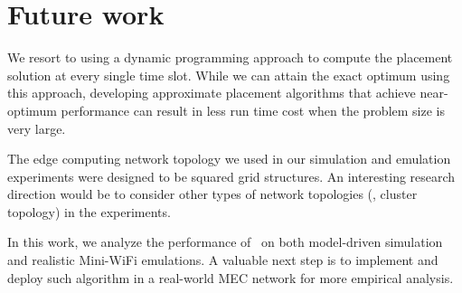 

\section{Future work}
\label{section:future work}

We resort to using a dynamic programming approach to compute the placement solution at every single time slot. While we can attain the exact optimum using this approach, developing approximate placement algorithms that achieve near-optimum performance can result in less run time cost when the problem size is very large.



The edge computing network topology we used in our simulation and emulation experiments were designed to be squared grid structures. An interesting research direction would be to consider other types of network topologies (\eg, cluster topology) in the experiments. 


In this work, we analyze the performance of \myalgorithm\ on both model-driven simulation and realistic Mini-WiFi emulations. A valuable next step is to implement and deploy such algorithm in a real-world MEC network for more empirical analysis.



